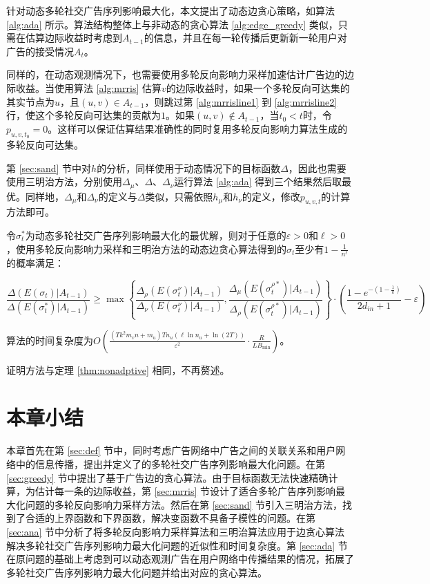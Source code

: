 针对动态多轮社交广告序列影响最大化，本文提出了动态边贪心策略，如算法 \ref{alg:ada} 所示。算法结构整体上与非动态的贪心算法 \ref{alg:edge_greedy} 类似，只需在估算边际收益时考虑到$A_{t-1}$的信息，并且在每一轮传播后更新新一轮用户对广告的接受情况$A_{t}$。


同样的，在动态观测情况下，也需要使用多轮反向影响力采样加速估计广告边的边际收益。当使用算法 \ref{alg:mrris} 估算$v$的边际收益时，如果一个多轮反向可达集的其实节点为$u$，且$(u,v) \in A_{t-1}$，则跳过第 \ref{alg:mrrisline1} 到 \ref{alg:mrrisline2} 行，使这个多轮反向可达集的贡献为$1$。如果$(u,v) \notin A_{t-1}$，当$t_0 < t$时，令$p_{u,v,t_0} = 0$。这样可以保证估算结果准确性的同时复用多轮反向影响力算法生成的多轮反向可达集。

第 \ref{sec:sand} 节中对$h$的分析，同样使用于动态情况下的目标函数$\Delta$，因此也需要使用三明治方法，分别使用$\Delta_\mu$、$\Delta$、$\Delta_\nu$运行算法 \ref{alg:ada} 得到三个结果然后取最优。同样地，$\Delta_\mu$和$\Delta_\nu$的定义与$\Delta$类似，只需依照$h_\mu$和$h_\nu$的定义，修改$p_{u,v,t}$的计算方法即可。

\begin{theorem}
令$\sigma_t^*$为动态多轮社交广告序列影响最大化的最优解，则对于任意的$\varepsilon>0$和$\ell > 0$，使用多轮反向影响力采样和三明治方法的动态边贪心算法得到的$\sigma_t$至少有$1-\frac{1}{n^{\ell}}$的概率满足：

\begin{equation}
    \frac{\Delta(E(\sigma_t) | A_{t-1})}{\Delta(E(\sigma_t^*) | A_{t-1})}
    \ge \max\left\{\frac{\Delta_\rho(E(\sigma_t^\nu) | A_{t-1} )}{\Delta_\nu(E(\sigma_t^\nu) | A_{t-1})},\frac{\Delta_\mu(E(\sigma_t^{\rho*})  | A_{t-1})}{\Delta_\rho(E(\sigma_t^{\rho*}) | A_{t-1})} \right\}
    \cdot\left(\frac{1-e^{-(1-\frac{1}{k})}}{2d_{in}+1}-\varepsilon\right)
\end{equation}

\noindent 算法的时间复杂度为$O\left(\frac{(Tk^2 m_v n + m_u)Tn_u(\ell \ln n_u + \ln (2T))}{\varepsilon^2}\cdot\frac{R}{LB_{\min}}\right)$。
\end{theorem}
证明方法与定理 \ref{thm:nonadptive} 相同，不再赘述。

\section{本章小结}

本章首先在第 \ref{sec:def} 节中，同时考虑广告网络中广告之间的关联关系和用户网络中的信息传播，提出并定义了的多轮社交广告序列影响最大化问题。在第 \ref{sec:greedy} 节中提出了基于广告边的贪心算法。由于目标函数无法快速精确计算，为估计每一条的边际收益，第 \ref{sec:mrris} 节设计了适合多轮广告序列影响最大化问题的多轮反向影响力采样方法。然后在第 \ref{sec:sand} 节引入三明治方法，找到了合适的上界函数和下界函数，解决变函数不具备子模性的问题。在第 \ref{sec:ana} 节中分析了将多轮反向影响力采样算法和三明治算法应用于边贪心算法解决多轮社交广告序列影响力最大化问题的近似性和时间复杂度。第 \ref{sec:ada} 节在原问题的基础上考虑到可以动态观测广告在用户网络中传播结果的情况，拓展了多轮社交广告序列影响力最大化问题并给出对应的贪心算法。

